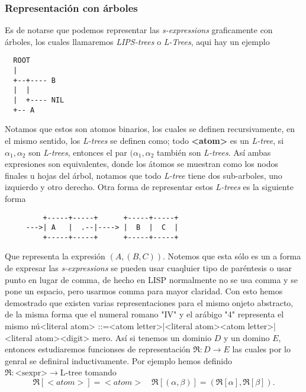 \documentclass[11pt]{article}
\begin{document}
\subsubsection{Representación con árboles}
\label{sec:org0ff7717}
Es de notarse que podemos representar las \emph{s-expressions} graficamente con árboles, los cuales llamaremos \emph{LIPS-trees} o \emph{L-Trees}, aqui hay un ejemplo
\begin{verbatim}
  ROOT
  |
  +--+---- B
  |  |
  |  +---- NIL
  +-- A
\end{verbatim}
Notamos que estos son atomos binarios, los cuales se definen recursivamente, en el mismo sentido, los \emph{L-trees} se definen como; todo \textbf{<atom>} es un \emph{L-tree}, si \(\alpha_1,\alpha_2\) son \emph{L-trees}, entonces el par \((\alpha_1,\alpha_2\) también son \emph{L-trees}. Así ambas expresiones son equivalentes, donde los átomos se muestran como los nodos finales u hojas del árbol, notamos que todo \emph{L-tree} tiene dos sub-arboles, uno izquierdo y otro derecho. Otra forma de representar estos \emph{L-trees} es la siguiente forma
\begin{verbatim}
         +-----+-----+      +-----+-----+
     --->| A   |  .--|----> |  B  |  C  |
         +-----+-----+      +-----+-----+
\end{verbatim}
Que representa la expresión \((A,(B,C))\). Notemos que esta sólo es un a forma de expresar las \emph{s-expressions} se pueden usar cuaqluier tipo de paréntesis o usar punto en lugar de  comma, de hecho en LISP normalmente no se usa comma y se pone un espacio, pero usarmos comma para mayor claridad.
Con esto hemos demostrado que existen varias representaciones para el mismo onjeto abstracto, de la misma forma que el numeral romano "IV" y el arábigo "4" representa el mismo nú<literal atom> ::=<atom letter>|<literal atom><atom letter>|<literal atom><digit>
mero. Así si tenemos un dominio \(D\) y un domino \(E\), entonces estudiaremos funcionses de representación \(\mathfrak{R}:D\to E\) las cuales por lo genral se definiral inductivamente. Por ejemplo hemos definido \(\mathfrak{R}:\textrm{<sexpr>}\to \textrm{L-tree}\) tomando
\[
        \mathfrak{R}[<atom>]=<atom>\quad \mathfrak{R}[(\alpha,\beta)]=( \mathfrak{R}[\alpha], \mathfrak{R}[\beta]).
\]
\end{document}
